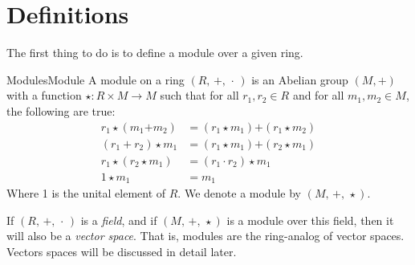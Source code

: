 \section{Definitions}
    The first thing to do is to define a module over a given ring.
    \begin{fdefinition}{Modules}{Module}
        A module on a ring $(R,\,+,\,\cdot\,)$ is an
        \gls{Abelian group} $(M,\boldsymbol{+})$ with a function
        $\star:R\times{M}\rightarrow{M}$ such that for all $r_{1},r_{2}\in{R}$
        and for all $m_{1},m_{2}\in{M}$, the following are true:
        \begin{align}
            r_{1}\star(m_{1}\boldsymbol{+}m_{2})
                &=(r_{1}\star{m}_{1})\boldsymbol{+}(r_{1}\star{m}_{2})
                \tag{Scalar Distributivity}\\
            (r_{1}+r_{2})\star{m}_{1}
                &=(r_{1}\star{m}_{1})\boldsymbol{+}(r_{2}\star{m}_{1})
                \tag{Module Distributivity}\\
            r_{1}\star(r_{2}\star{m}_{1})
                &=(r_{1}\cdot{r}_{2})\star{m}_{1}
                \tag{Associativity}\\
            1\star{m}_{1}&=m_{1}
            \tag{Identity}
        \end{align}
        Where 1 is the unital element of $R$. We denote a module by
        $(M,\,\boldsymbol{+},\,\star)$.
    \end{fdefinition}
    If $(R,\,+,\,\cdot\,)$ is a \textit{field}, and if
    $(M,\,\boldsymbol{+},\,\star)$ is a module over this field, then it will
    also be a \textit{vector space}. That is, modules are
    the ring-analog of vector spaces. Vectors spaces will be discussed in
    detail later.
